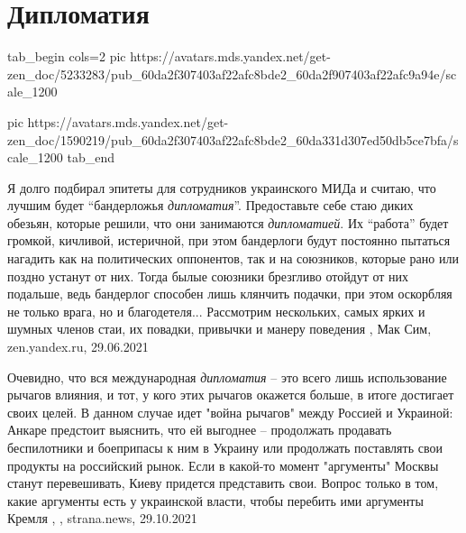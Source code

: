  
 
 
 
 
\chapter{Дипломатия}
\label{sec:slova.diplomatia}

\ifcmt

\ifcmt
  tab_begin cols=2
    pic https://avatars.mds.yandex.net/get-zen_doc/5233283/pub_60da2f307403af22afc8bde2_60da2f907403af22afc9a94e/scale_1200

    pic https://avatars.mds.yandex.net/get-zen_doc/1590219/pub_60da2f307403af22afc8bde2_60da331d307ed50db5ce7bfa/scale_1200
  tab_end
\fi

\fi
Я долго подбирал эпитеты для сотрудников украинского МИДа и считаю, что лучшим
будет \enquote{бандерложья \emph{дипломатия}}.  Предоставьте себе стаю диких обезьян, которые
решили, что они занимаются \emph{дипломатией}. Их \enquote{работа} будет громкой, кичливой,
истеричной, при этом бандерлоги будут постоянно пытаться нагадить как на
политических оппонентов, так и на союзников, которые рано или поздно устанут от
них. Тогда былые союзники брезгливо отойдут от них подальше, ведь бандерлог
способен лишь клянчить подачки, при этом оскорбляя не только врага, но и
благодетеля...  Рассмотрим нескольких, самых ярких и шумных членов стаи, их
повадки, привычки и манеру поведения
, 
Мак Сим, zen.yandex.ru, 29.06.2021

Очевидно, что вся международная \emph{дипломатия} – это всего лишь
использование рычагов влияния, и тот, у кого этих рычагов окажется больше, в
итоге достигает своих целей.  В данном случае идет "война рычагов" между
Россией и Украиной: Анкаре предстоит выяснить, что ей выгоднее – продолжать
продавать беспилотники и боеприпасы к ним в Украину или продолжать поставлять
свои продукты на российский рынок. Если в какой-то момент "аргументы" Москвы
станут перевешивать, Киеву придется представить свои. Вопрос только в том,
какие аргументы есть у украинской власти, чтобы перебить ими аргументы Кремля
, 
, strana.news, 29.10.2021
